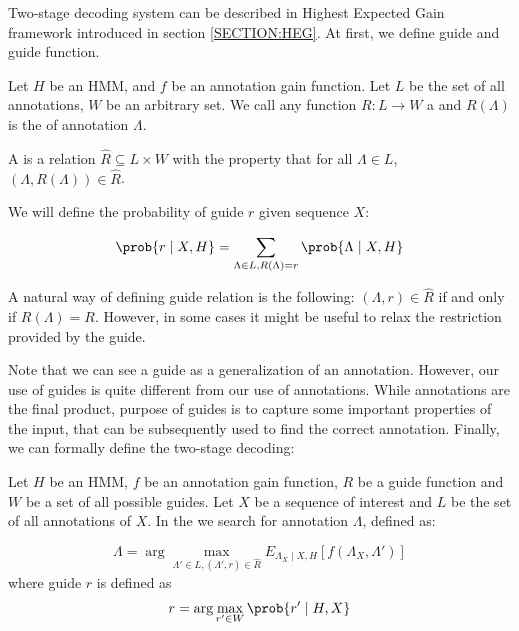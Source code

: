 Two-stage decoding system can be described in Highest Expected Gain framework
introduced in section \ref{SECTION:HEG}. At first, we define guide and guide
function.

\begin{definition}
Let $H$ be an HMM, and $f$ be an annotation gain function. Let $L$ be the set of
all annotations, $W$ be an arbitrary set. We call any function
$R:L\to W$ a  and $R(\Lambda)$ is the
 of annotation $\Lambda$.

A  is a relation $\hat{R}\subseteq L\times W$
with the property that for all $\Lambda\in L$, $(\Lambda, R(\Lambda))\in \hat{R}$.

We will define the probability of guide $r$ given sequence $X$:

\begin{equation}
\prob{r\mid X, H} = \sum_{\Lambda \in L, R(\Lambda)=r} \prob{\Lambda\mid X, H}
\end{equation}

\end{definition}

A natural way of defining guide relation is the following: $(\Lambda, r)\in
\hat{R}$ if and only if $R(\Lambda)=R$. However, in some cases it might be
useful to relax the restriction provided by the guide. 

Note that we can see a guide as a generalization of an annotation. However, our
use of guides is quite different from our use of annotations. While annotations
are the final product, purpose of guides is to capture some important
properties of the input, that can be subsequently used to find the correct
annotation. Finally, we can formally define the two-stage decoding:

\begin{definition}
Let $H$ be an HMM, $f$ be an annotation gain function, $R$ be a guide 
function and $W$ be a set of all possible guides. Let $X$ be a sequence of
interest and $L$ be the set of all annotations of $X$. In the  we search for annotation $\Lambda$, defined as:

\begin{equation}
\Lambda = \arg\max_{\Lambda'\in L, (\Lambda', r)\in \hat{R}}E_{\Lambda_X\mid
X,H}[f(\Lambda_X,\Lambda')]\label{EQUATION:HIGHEST_EXPECTED_RESTRICTED_REWARD}
\end{equation}
where guide $r$ is defined as
\begin{equation}
r = \arg\max_{r'\in W}\prob{r'\mid H, X}
\label{EQUATION:MOST_PROBABLE_RESTRICTION}
\end{equation}
\end{definition}

